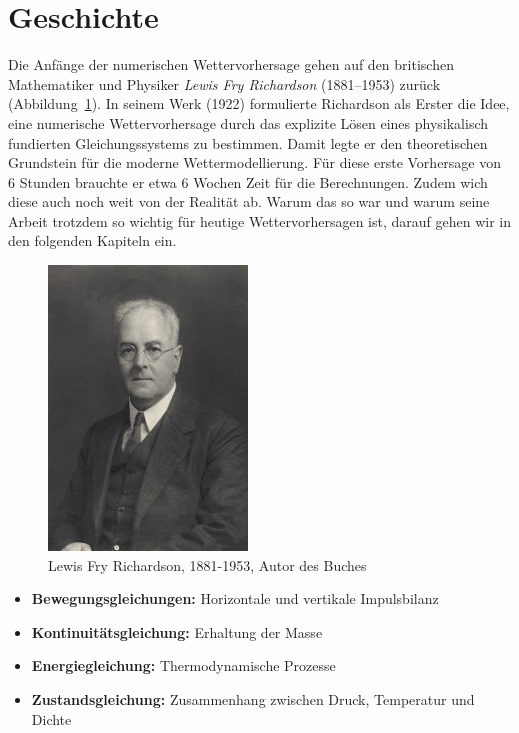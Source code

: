 %
%
%
%
\section{Geschichte\label{geostrophisch:section:geschichte}}

Die Anfänge der numerischen Wettervorhersage gehen auf den britischen Mathematiker und Physiker \emph{Lewis Fry Richardson} (1881–1953) zurück (Abbildung~\ref{bild:portraitRichi}).  
In seinem Werk \cite{zhfnhf:wpbnp} (1922) formulierte Richardson als Erster die Idee, eine numerische Wettervorhersage durch das explizite Lösen eines physikalisch fundierten Gleichungssystems zu bestimmen.  
Damit legte er den theoretischen Grundstein für die moderne Wettermodellierung.
Für diese erste Vorhersage von 6 Stunden brauchte er etwa 6 Wochen Zeit für die Berechnungen.
Zudem wich diese auch noch weit von der Realität ab.
Warum das so war und warum seine Arbeit trotzdem so wichtig für heutige Wettervorhersagen ist, darauf gehen wir in den folgenden Kapiteln ein. 

\begin{figure}[h]
	\centering
	\includegraphics{Portrait_Richardson.jpg}
	\caption{Lewis Fry Richardson, 1881-1953, Autor des Buches }
	\label{bild:portraitRichi}
\end{figure}

\begin{itemize}
	\item \textbf{Bewegungsgleichungen:} Horizontale und vertikale Impulsbilanz
	\item \textbf{Kontinuitätsgleichung:} Erhaltung der Masse
	\item \textbf{Energiegleichung:} Thermodynamische Prozesse
	\item \textbf{Zustandsgleichung:} Zusammenhang zwischen Druck, Temperatur und Dichte
\end{itemize}






